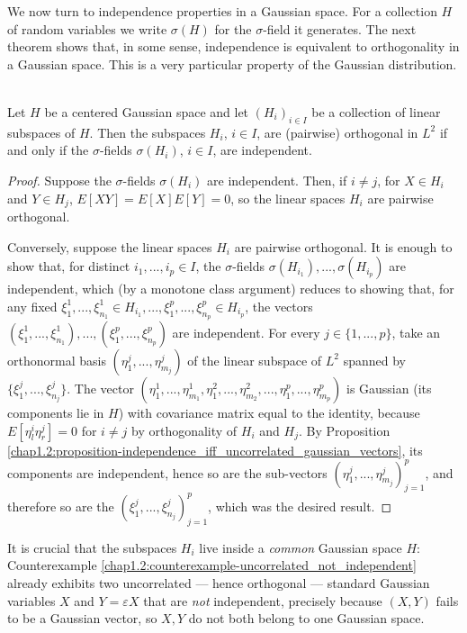We now turn to independence properties in a Gaussian space. For a collection $H$ of random variables we write $\sigma(H)$ for the $\sigma$-field it generates. The next theorem shows that, in some sense, independence is equivalent to orthogonality in a Gaussian space. This is a very particular property of the Gaussian distribution.

\begin{theorem}[Independence = orthogonality] \label{chap1.3:theorem-independence_iff_orthogonality}
 \\
Let $H$ be a centered Gaussian space and let $(H_i)_{i \in I}$ be a collection of linear subspaces of $H$. Then the subspaces $H_i$, $i \in I$, are (pairwise) orthogonal in $L^2$ if and only if the $\sigma$-fields $\sigma(H_i)$, $i \in I$, are independent.
\end{theorem}
\begin{proof}
Suppose the $\sigma$-fields $\sigma(H_i)$ are independent. Then, if $i \neq j$, for $X \in H_i$ and $Y \in H_j$, $E[XY]=E[X]E[Y]=0$, so the linear spaces $H_i$ are pairwise orthogonal.

Conversely, suppose the linear spaces $H_i$ are pairwise orthogonal. It is enough to show that, for distinct $i_1,...,i_p \in I$, the $\sigma$-fields $\sigma(H_{i_1}),...,\sigma(H_{i_p})$ are independent, which (by a monotone class argument) reduces to showing that, for any fixed $\xi_1^1,...,\xi_{n_1}^1 \in H_{i_1}, ..., \xi_1^p,...,\xi_{n_p}^p \in H_{i_p}$, the vectors $(\xi_1^1,...,\xi_{n_1}^1),...,(\xi_1^p,...,\xi_{n_p}^p)$ are independent. For every $j \in \{1,...,p\}$, take an orthonormal basis $(\eta_1^j,...,\eta_{m_j}^j)$ of the linear subspace of $L^2$ spanned by $\{\xi_1^j,...,\xi_{n_j}^j\}$. The vector $(\eta_1^1,...,\eta_{m_1}^1,\eta_1^2,...,\eta_{m_2}^2,...,\eta_1^p,...,\eta_{m_p}^p)$ is Gaussian (its components lie in $H$) with covariance matrix equal to the identity, because $E[\eta_l^i\eta_r^j]=0$ for $i \neq j$ by orthogonality of $H_i$ and $H_j$. By Proposition \ref{chap1.2:proposition-independence_iff_uncorrelated_gaussian_vectors}, its components are independent, hence so are the sub-vectors $(\eta_1^j,...,\eta_{m_j}^j)_{j=1}^p$, and therefore so are the $(\xi_1^j,...,\xi_{n_j}^j)_{j=1}^p$, which was the desired result.
\end{proof}
\begin{trap}
It is crucial that the subspaces $H_i$ live inside a \emph{common} Gaussian space $H$: Counterexample \ref{chap1.2:counterexample-uncorrelated_not_independent} already exhibits two uncorrelated --- hence orthogonal --- standard Gaussian variables $X$ and $Y=\varepsilon X$ that are \emph{not} independent, precisely because $(X,Y)$ fails to be a Gaussian vector, so $X,Y$ do not both belong to one Gaussian space.
\end{trap}

